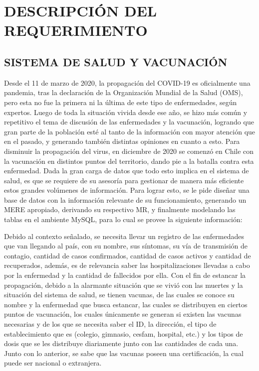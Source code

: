 \documentclass[letterpaper]{article}
\begin{document}
\section{DESCRIPCIÓN DEL REQUERIMIENTO}
\subsection{SISTEMA DE SALUD Y VACUNACIÓN}

Desde el 11 de marzo de 2020, la propagación del COVID-19 es oficialmente una pandemia, tras la declaración de la Organización Mundial de la Salud (OMS), pero esta no fue la primera ni la última de este tipo de enfermedades, según expertos. Luego de toda la situación vivida desde ese año, se hizo más común y repetitivo el tema de discusión de las enfermedades y la vacunación, logrando que gran parte de la población esté al tanto de la información con mayor atención que en el pasado, y generando también distintas opiniones en cuanto a esto. Para disminuir la propagación del virus, en diciembre de 2020 se comenzó en Chile con la vacunación en distintos puntos del territorio, dando pie a la batalla contra esta enfermedad. Dada la gran carga de datos que todo esto implica en el sistema de salud, es que se requiere de su asesoría para gestionar de manera más eficiente estos grandes volúmenes de información. Para lograr esto, se le pide diseñar una base de datos con la información relevante de su funcionamiento, generando un MERE apropiado, derivando su respectivo MR, y finalmente modelando las tablas en el ambiente MySQL, para lo cual se provee la siguiente información:

Debido al contexto señalado, se necesita llevar un registro de las enfermedades que van llegando al país, con su nombre, sus síntomas, su vía de transmisión de contagio, cantidad de casos confirmados, cantidad de casos activos y cantidad de recuperados, además, es de relevancia saber las hospitalizaciones llevadas a cabo por la enfermedad y la cantidad de fallecidos por ella. Con el fin de estancar la propagación, debido a la alarmante situación que se vivió con las muertes y la situación del sistema de salud, se tienen vacunas, de las cuales se conoce su nombre y la enfermedad que busca estancar, las cuales se distribuyen en ciertos puntos de vacunación, los cuales únicamente se generan si existen las vacunas necesarias y de los que se necesita saber el ID, la dirección, el tipo de establecimiento que es (colegio, gimnasio, cesfam, hospital, etc.) y los tipos de dosis que se les distribuye diariamente junto con las cantidades de cada una. Junto con lo anterior, se sabe que las vacunas poseen una certificación, la cual puede ser nacional o extranjera.
\end{document}
